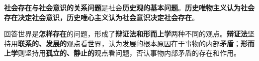 \textbf{{社会存在与社会意识的关系问题}}是社会\textbf{{历史观的基本问题}}。\textbf{{历史唯物主义认为社会存在决定社会意识，历史唯心主义认为社会意识决定社会存在}}。

{回答世界是}\textbf{{怎样存在}}{的问题，形成了}\textbf{{辩证法和形而上学}}{两种不同的观点。}\textbf{{辩证法}}{坚持用}\textbf{{联系的、发展的}}{观点看世界，认为发展的根本原因在于事物的内部}\textbf{{矛盾}}{；}\textbf{{形而上学}}{则坚持用}\textbf{{孤立的、静止的}}{观点看问题，否认事物内部矛盾的存在和作用。}
